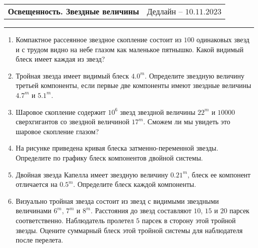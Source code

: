 \documentclass[12pt]{article}
\begin{document}
 \begin{tabularx}{\textwidth}{Xr}
  {\Large \textbf{Освещенность. Звездные величины}} & Дедлайн -- $10.11.2023$ \\
 \end{tabularx}
 \noindent\rule{\textwidth}{0.4pt}
 \begin{enumerate}
        \item Компактное рассеянное звездное скопление состоит из $100$ одинаковых звезд и с трудом видно на небе глазом как маленькое пятнышко. Какой видимый блеск имеет каждая из звезд?

        \item Тройная звезда имеет видимый блеск $4.0^m$. Определите звездную величину третьей компоненты, если первые две компоненты имеют звездные величины $4.7^m$ и $5.1^m$.

        \item Шаровое скопление содержит $10^{6}$ звезд звездной величины $22^m$ и $10 000$ сверхгигантов со звездной величиной $17^m$. Сможем ли мы увидеть это шаровое скопление глазом?

        \item На рисунке приведена кривая блеска  затменно-переменной звезды. Определите по графику блеск компонентов двойной системы.

  \begin{figure}[h] 	
  	\centering
\end{figure}

        \item Двойная звезда Капелла имеет звездную величину $0.21^m$, блеск ее компонент отличается на $0.5^m$. Определите блеск каждой компоненты.

        \item Визуально тройная звезда состоит из звезд с видимыми звездными величинами $6^m$, $7^m$ и $8^m$. Расстояния до звезд составляют $10$, $15$ и $20$ парсек соответственно. Наблюдатель пролетел $5$ парсек в сторону этой тройной звезды. Оцените суммарный блеск этой тройной системы для наблюдателя после перелета.


\end{enumerate}
\end{document}

